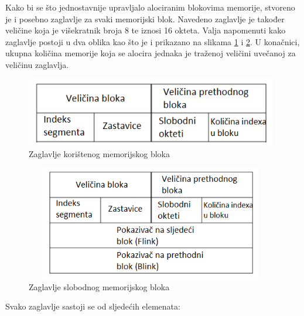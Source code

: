 \documentclass[times, utf8, diplomski, numeric]{fer}
\begin{document}
Kako bi se što jednostavnije upravljalo alociranim blokovima
memorije, stvoreno je i posebno zaglavlje za svaki memorijski
blok. Navedeno zaglavlje je također veličine koja je višekratnik
broja 8 te iznosi 16 okteta. Valja napomenuti kako zaglavlje
postoji u dva oblika kao što je i prikazano na slikama
\ref{fig:used_heap_block} i \ref{fig:free_heap_block}. U
konačnici, ukupna količina memorije koja se alocira jednaka je
traženoj veličini uvečanoj za veličinu zaglavlja.

\pagebreak

\begin{figure}[!ht]
\centering
\setlength\fboxsep{0pt}
\setlength\fboxrule{0.5pt}
\includegraphics[width=11cm, height=3cm]{slike/used_heap_block}
\caption{Zaglavlje korištenog memorijskog bloka}
\label{fig:used_heap_block} 
\end{figure}

\begin{figure}[!ht]
\centering
\setlength\fboxsep{0pt}
\setlength\fboxrule{0.5pt}
\includegraphics[width=11cm, height=5cm]{slike/free_heap_block}
\caption{Zaglavlje slobodnog memorijskog bloka}
\label{fig:free_heap_block} 
\end{figure}
\pagebreak

Svako zaglavlje sastoji se od sljedećih elemenata:
\end{document}
